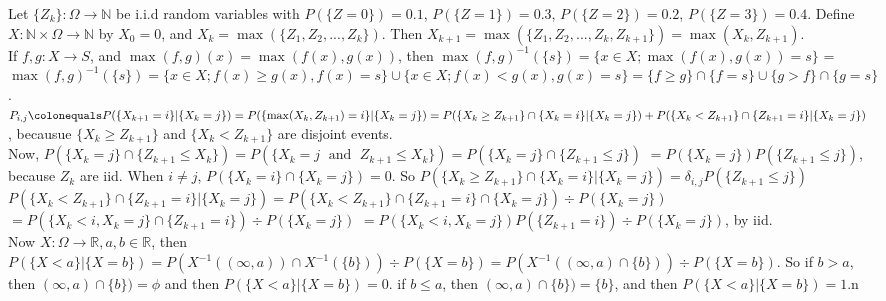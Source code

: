 \documentclass[12pt]{article}
\newcommand{\nats}[0] { \mathbb{N}}
\newcommand{\reals}[0] { \mathbb{R}}
\newcommand{\Om}[0] { \Omega }
\newcommand{\AND}[0]{ \; \textrm{ and } \;  }
\newcommand{\rarw}[0] { \rightarrow }
\newcommand{ \defeq }[0] { \colonequals }
\begin{document}
\vspace{.5in}

Let $\{ Z_k\}: \Om \rarw \nats $ be i.i.d random variables with  $P(\{ Z=0 \})=0.1$, $P(\{ Z=1 \})=0.3$,  $P(\{ Z=2 \})=0.2$,  $P(\{ Z=3 \})=0.4$. Define $X: \nats \times \Om \rarw \nats$ by $X_0 = 0$, and $X_k = \max( \{ Z_1, Z_2, ... , Z_k \} )$. Then $X_{k+1} = \max( \{ Z_1, Z_2, ... , Z_k, Z_{k+1} \} ) = \max( X_k, Z_{k+1} )$. \\


If $f,g : X \rarw S$, and $\max(f,g)(x) = \max(f(x),g(x))$, then $\max(f,g)^{-1}(\{s\}) = \{ x \in X; \max(f(x),g(x)) = s\}$ = 
$\max(f,g)^{-1}(\{s\}) = \{ x \in X; f(x) \ge g(x), f(x) = s \} \cup  \{ x \in X; f(x) < g(x), g(x) = s \} = \{ f \ge g \} \cap \{ f = s \} \cup \{ g > f \} \cap \{ g = s \} $.  \\

$P_{i,j} \defeq P( \{ X_{k+1} = i \} | \{ X_{k} = j \} ) = P( \{ \max(X_k, Z_{k+1})= i \} | \{ X_{k} = j \} ) = P( \{  X_k \ge Z_{k+1} \} \cap \{ X_k= i \} | \{ X_{k} = j \} ) + P( \{  X_k < Z_{k+1} \} \cap \{ Z_{k+1}= i \} | \{ X_{k} = j \} )$, becausue $\{  X_k \ge Z_{k+1} \}$ and $\{  X_k < Z_{k+1} \}$ are disjoint events. \\

Now, $P( \{ X_k = j \} \cap \{  Z_{k+1} \le X_k \} ) = P(\{ X_k=j \AND Z_{k+1} \le X_k \}) = P(\{ X_k=j \} \cap \{ Z_{k+1} \le j \})$ $= P(\{ X_k=j \} ) P( \{ Z_{k+1} \le j \})$, because $Z_k$ are iid. When $i \not = j$, $P( \{ X_k= i \} \cap \{ X_{k} = j \} ) = 0$. So $P( \{  X_k \ge Z_{k+1} \} \cap \{ X_k= i \} | \{ X_{k} = j \} ) = \delta_{i,j} P( \{  Z_{k+1} \le j \}  ) $ \\ 


$P( \{  X_k < Z_{k+1} \} \cap \{ Z_{k+1}= i \} | \{ X_{k} = j \} ) = P( \{  X_k < Z_{k+1} \} \cap \{ Z_{k+1}= i \} \cap \{ X_{k} = j \} ) \div P(\{ X_{k} = j \}) $
$= P( \{  X_k < i,X_{k} = j \}  \cap \{ Z_{k+1}= i \} ) \div P(\{ X_{k} = j \}) $
$= P( \{  X_k < i,X_{k} = j \} ) P( \{ Z_{k+1}= i \} ) \div P(\{ X_{k} = j \}) $, by iid.  \\

Now $X: \Om \rarw \reals, a,b \in \reals$, then $P( \{ X < a \} | \{ X = b \}) = P( X^{-1} ((\infty,a)) \cap X^{-1}(\{b\})) \div P(\{X=b\}) = P( X^{-1} ((\infty,a) \cap \{b\})) \div P(\{X=b\})$. So if $b > a$, then $(\infty,a) \cap \{b\}) = \phi$ and then $P( \{ X < a \} | \{ X = b \}) = 0$. if $b \le a$, then $(\infty,a) \cap \{b\}) = \{ b \}$, and then $P( \{ X < a \} | \{ X = b \}) = 1$.n \\
\end{document}
